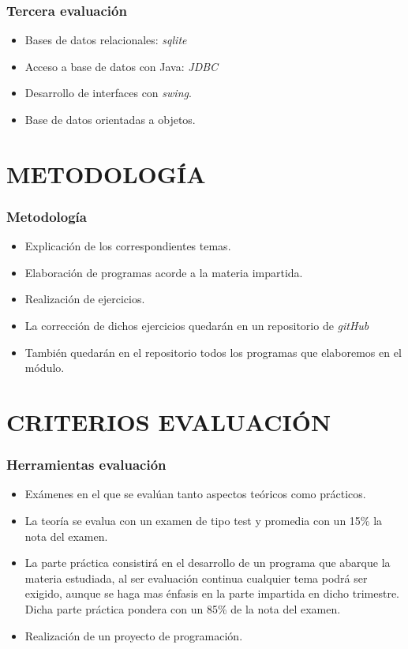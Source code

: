 \documentclass{beamer}
\begin{document}
\begin{frame}[fragile]
\frametitle{Tercera evaluación}
\begin{itemize}[<+-| alert@+>]
\item Bases de datos relacionales: \emph{sqlite} 
\item Acceso a base de datos con Java: \emph{JDBC}
\item Desarrollo de interfaces con \emph{swing}.
\item Base de datos orientadas a objetos.
\end{itemize}
\pause
\end{frame}



\section{METODOLOGÍA}
\begin{frame}[fragile]
\frametitle{Metodología}
\begin{itemize}[<+->]
\item Explicación de los correspondientes temas.
\item Elaboración de programas acorde a la materia impartida.
\item Realización de ejercicios.
\item La corrección de dichos ejercicios quedarán en un repositorio de \emph{gitHub}
\item También quedarán en el repositorio todos los programas que elaboremos en el módulo.
\end{itemize}
\end{frame}

\section{CRITERIOS EVALUACIÓN}
\begin{frame}
\frametitle{Herramientas evaluación}
\begin{itemize}[<+-| alert@+>]
\item Exámenes en el que se evalúan tanto aspectos teóricos como prácticos.
\item La teoría se evalua con un examen de tipo test y promedia con un 15\% la nota del examen.
\item La parte práctica consistirá en el desarrollo de un programa que abarque la materia estudiada, al ser evaluación continua cualquier tema podrá ser exigido, aunque se haga mas énfasis en la parte impartida en dicho trimestre. Dicha parte práctica pondera con un 85\% de la nota del examen.
\item Realización de un proyecto de programación.
\end{itemize}
\pause
\end{frame}
\end{document}
